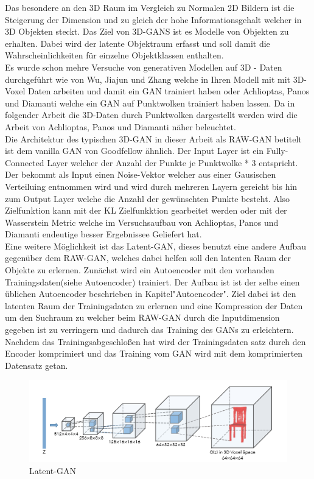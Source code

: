 \documentclass{llncs}
\begin{document}
Das besondere an den 3D Raum im Vergleich zu Normalen 2D Bildern ist die Steigerung der Dimension und zu gleich der hohe Informationsgehalt welcher in 3D Objekten steckt. Das Ziel von 3D-GANS ist es Modelle von Objekten zu erhalten. Dabei wird der latente Objektraum erfasst und soll damit die Wahrscheinlichkeiten für einzelne Objektklassen enthalten. 
\\
Es wurde schon mehre Versuche von generativen Modellen auf 3D - Daten durchgeführt wie von Wu, Jiajun und Zhang \cite{3d} welche in Ihren Modell mit mit 3D-Voxel Daten arbeiten und damit ein GAN trainiert haben oder Achlioptas, Panos und Diamanti\cite{3dgan} welche ein GAN auf Punktwolken trainiert haben lassen. Da in folgender Arbeit die 3D-Daten durch Punktwolken dargestellt werden wird die Arbeit von Achlioptas, Panos und Diamanti näher beleuchtet.
\\
Die Architektur des typischen 3D-GAN in dieser Arbeit als RAW-GAN betitelt ist dem vanilla GAN von Goodfellow ähnlich. Der Input Layer ist ein Fully-Connected Layer welcher der Anzahl der Punkte je Punktwolke * 3 entspricht. Der bekommt als Input einen Noise-Vektor welcher aus einer Gausischen Verteiluing entnommen wird und wird durch mehreren Layern gereicht bis hin zum Output Layer welche die Anzahl der gewünschten Punkte besteht. Also Zielfunktion kann mit der KL Zielfunkktion gearbeitet werden oder mit der Wasserstein Metric welche im Versuchsaufbau von Achlioptas, Panos und Diamanti endeutige besser Ergebnissee Geliefert hat.  
\\
Eine weitere Möglichkeit ist das Latent-GAN, dieses benutzt eine andere Aufbau gegenüber dem RAW-GAN, welches dabei helfen soll den  latenten Raum der Objekte zu erlernen. Zunächst wird ein Autoencoder mit den vorhanden Trainingsdaten(siehe Autoencoder) trainiert. Der Aufbau ist ist der selbe einen üblichen Autoencoder beschrieben in Kapitel"Autoencoder". Ziel dabei ist den latenten Raum der Trainingsdaten zu erlernen und eine Kompression der Daten um den Suchraum zu  welcher beim RAW-GAN durch die Inputdimension gegeben ist zu verringern und dadurch das Training des GANs zu erleichtern. 
\\
Nachdem das Trainingsabgeschloßen hat wird der Trainingsdaten satz durch den Encoder komprimiert und das Training vom GAN wird mit dem komprimierten Datensatz getan. 

\begin{figure}[htbp] 
	\centering
	\includegraphics[width=1.2\textwidth]{3dgan.png}
	\caption{Latent-GAN}
	\label{fig:Bild30}
\end{figure}
\cite{3d}
\end{document}
